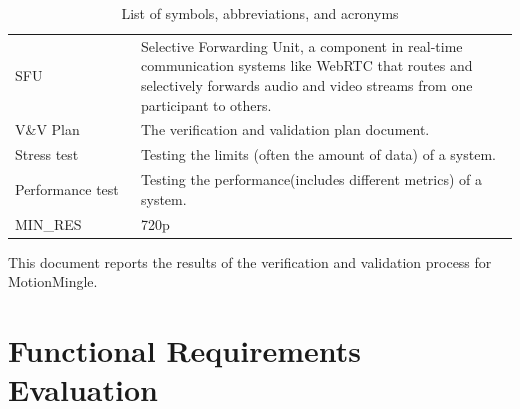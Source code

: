 \documentclass[12pt, titlepage]{article}
\begin{document}
\begin{table}[H]
\begin{tabular}{L{0.25\linewidth}L{0.8\linewidth}}
    SFU                        & Selective Forwarding Unit, a component in real-time communication systems like WebRTC that routes and selectively forwards audio and video streams from one participant to others. \\
    V\&V Plan                  & The verification and validation plan document.                                                                                                                                     \\
    Stress test                & Testing the limits (often the amount of data) of a system.                                                                                                                         \\
    Performance test           & Testing the performance(includes different metrics) of a system.                                                                                                                   \\
    MIN\_RES \label{const:res} & 720p                                                                                                                                                                               \\ \bottomrule
  \end{tabular}
  \caption{List of symbols, abbreviations, and acronyms}
  \label{tab:abbrv}
\end{table}

\newpage

\tableofcontents

\listoftables %

\listoffigures %

\newpage


This document reports the results of the verification and validation process for
MotionMingle.

\section{Functional Requirements Evaluation}
\end{document}
